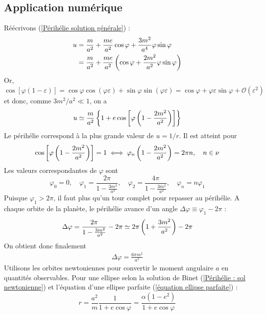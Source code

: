 \subsection{Application numérique}
Réécrivons (\ref{Périhélie solution générale}) : 
\begin{align}
    u &= \frac{m}{a^2} + \frac{me}{a^2} \cos \varphi + \frac{3m^2}{a^4} \varphi \sin \varphi \\
    &= \frac{m}{a^2} + \frac{me}{a^2} \left( \cos \varphi + \frac{2m^2}{a^2} \varphi \sin \varphi \right)
\end{align}
Or, $\cos [ \varphi (1-\varepsilon)] = \cos \varphi \cos (\varphi \varepsilon ) + \sin \varphi \sin (\varphi \varepsilon ) = \cos \varphi + \varphi \varepsilon \sin\varphi + \mathcal{O}(\varepsilon^2)$ et donc, comme $3m^2/a^2 \ll 1$, on a
\begin{equation}
    u \simeq \frac{m}{a^2} \left\{ 1 + e \cos \left[ \varphi \left( 1 - \frac{2m^2}{a^2} \right)\right] \right\}
\end{equation}
Le périhélie correspond à la plus grande valeur de $u = 1/r$. Il est atteint pour 
\begin{equation}
    \cos \left[ \varphi \left( 1 - \frac{2m^2}{a^2} \right)\right] = 1 \iff \varphi_n \left( 1 - \frac{2m^2}{a^2} \right) = 2\pi n, \quad n \in \nu
\end{equation}
Les valeurs correspondantes de $\varphi$ sont
\begin{equation}
    \varphi_0 = 0, \quad \varphi_1 = \frac{2\pi}{1- \frac{3m^2}{a^2}},\quad \varphi_2 = \frac{4\pi}{1- \frac{3m^2}{a^2}}, \quad \varphi_n = n \varphi_1
\end{equation}
Puisque $\varphi_1 > 2\pi$, il faut plus qu'un tour complet pour repasser au périhélie. A chaque orbite de la planète, le périhélie avance d'un angle $\Delta \varphi \equiv \varphi_1 - 2\pi$ : 
\begin{align}
    \Delta \varphi = \frac{2\pi}{1- \frac{3m^2}{a^2}} - 2\pi \simeq 2\pi \left( 1 + \frac{3m^2}{a^2}\right) - 2 \pi
\end{align}
On obtient donc finalement 
\begin{align}
    \boxed{\Delta \varphi = \frac{6\pi m^2}{a^2}}
\end{align}
Utilisons les orbites newtoniennes pour convertir le moment angulaire $a$ en quantités observables. Pour une ellipse selon la solution de Binet (\ref{Périhélie : sol newtonienne}) et l'équation d'une ellipse parfaite (\ref{équation ellipse parfaite}) :
\begin{equation}
    r = \frac{a^2}{m} \frac{1}{1 +e \cos\varphi} = \frac{\alpha (1-e^2)}{1 + e \cos \varphi}
\end{equation}
